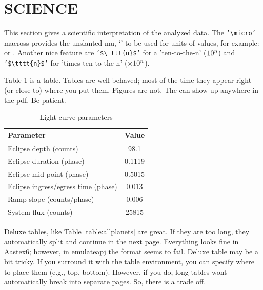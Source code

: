 \section{SCIENCE}
\label{sec:science}

This section gives a scientific interpretation of the analyzed data.
The \texttt{'\textbackslash micro'} macross provides the unslanted mu,
`{\micro}' to be used for units of values, for example: {\micron} or
{\microbar}.  Another nice feature are \texttt{'\$\textbackslash
  ttt\{n\}\$'} for a 'ten-to-the-n' ($\ttt{n}$) and
\texttt{'\$\textbackslash tttt\{n\}\$'} for 'times-ten-to-the-n'
($\tttt{n}$).

Table \ref{table:parameters} is a table.  Tables are well behaved;
most of the time they appear right (or close to) where you put them.
Figures are not.  The can show up anywhere in the pdf.   Be patient.

\begin{table}[ht]
\centering
\caption{\label{table:parameters} Light curve parameters}
\begin{tabular}{lc}
\hline
\hline
Parameter                           & Value           \\
\hline
Eclipse depth (counts)              & 98.1            \\
Eclipse duration (phase)            & 0.1119          \\
Eclipse mid point (phase)           & 0.5015          \\
Eclipse ingress/egress time (phase) & 0.013           \\
Ramp slope (counts/phase)           & 0.006           \\
System flux (counts)                & 25815           \\
\hline
\end{tabular}
\end{table}


Deluxe tables, like Table \ref{table:allplanets} are great. If they
are too long, they automatically split and continue in the next
page. Everything looks fine in Aastex6; however, in emulateapj the
format seems to fail.
Deluxe table may be a bit tricky. If you surround it with the table
environment, you can specify where to place them (e.g., top, bottom).
However, if you do, long tables wont automatically break into separate
pages.  So, there is a trade off.


